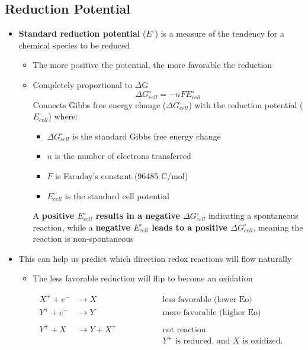 \documentclass[10pt]{article}
\begin{document}
\subsection*{Reduction Potential}
\begin{itemize}
	\item \textbf{Standard reduction potential} ($E^\circ$) is a measure of the tendency for a chemical species to be reduced
	\begin{itemize}
        \item The more positive the potential, the more favorable the reduction
        \item Completely proportional to $\Delta$G
        \[\Delta G^\circ_{cell} = -nFE^\circ_{cell}\]
        Connects Gibbs free energy change ($\Delta G^\circ_{cell}$) with the reduction potential ($E^\circ_{cell}$) where:
        \begin{itemize}
            \item $\Delta G^\circ_{cell}$ is the standard Gibbs free energy change
            \item $n$ is the number of electrons transferred
            \item $F$ is Faraday's constant (96485 C/mol)
            \item $E^\circ_{cell}$ is the standard cell potential
        \end{itemize}
        A \textbf{positive $E^\circ_{cell}$ results in a negative $\Delta G^\circ_{cell}$} indicating a spontaneous reaction, while a \textbf{negative $E^\circ_{cell}$ leads to a positive $\Delta G^\circ_{cell}$}, meaning the reaction is non-spontaneous
    \end{itemize}
    \item This can help us predict which direction redox reactions will flow naturally
    \begin{itemize}
        \item The less favorable reduction will flip to become an oxidation
    \end{itemize}
    \begin{align*}
        X^+ + e^- &\longrightarrow X \hspace{2cm} &\text{less favorable (lower Eo)}\\
        Y^+ + e^- &\longrightarrow Y \hspace{2cm} &\text{more favorable (higher Eo)}\\
        \\
        Y^+ + X &\longrightarrow Y + X^+ \hspace{2cm} &\text{net reaction}\\
        & &\text{$Y^+$ is reduced, and $X$ is oxidized.}
    \end{align*}
\end{itemize}
\end{document}
